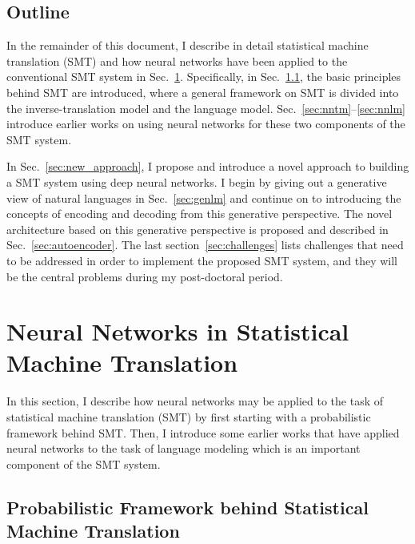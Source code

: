 \documentclass[11pt, oneside]{essay}
\begin{document}
\subsection{Outline}

In the remainder of this document, I describe in detail
statistical machine translation (SMT) and how neural networks
have been applied to the conventional SMT system in
Sec.~\ref{sec:smt}. Specifically, in Sec.~\ref{sec:smt-basic},
the basic principles behind SMT are introduced, where a
general framework on SMT is divided into the
inverse-translation model and the language model. 
Sec.~\ref{sec:nntm}--\ref{sec:nnlm} introduce earlier works on
using neural networks for these two components of the SMT system. 

In Sec.~\ref{sec:new_approach}, I propose and introduce a novel
approach to building a SMT system using deep neural networks.  I
begin by giving out a generative view of natural languages in
Sec.~\ref{sec:genlm} and continue on to introducing the concepts
of encoding and decoding from this generative perspective. The
novel architecture based on this generative perspective is
proposed and described in Sec.~\ref{sec:autoencoder}. The last
section~\ref{sec:challenges} lists challenges that need to be
addressed in order to implement the proposed SMT system, and they
will be the central problems during my post-doctoral period.











\section{Neural Networks in Statistical Machine Translation}
\label{sec:smt}

In this section, I describe how neural networks may be applied to
the task of statistical machine translation (SMT) by first
starting with a probabilistic framework behind SMT. Then, I
introduce some earlier works that have applied neural networks to
the task of language modeling which is an important component of
the SMT system.

\subsection{Probabilistic Framework behind Statistical Machine
Translation}
\label{sec:smt-basic}
\end{document}
